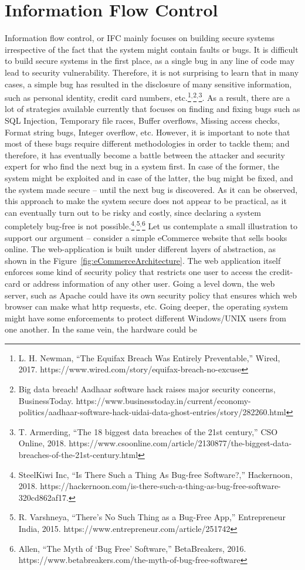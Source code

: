 \section{Information Flow Control}
\label{section:InformationFlowControl}
Information flow control, or IFC mainly focuses on building secure systems irrespective of the fact that the system might contain faults or bugs. It is difficult to build secure systems in the first place, as a single bug in any line of code may lead to security vulnerability. Therefore, it is not surprising to learn that in many cases, a simple bug has resulted in the disclosure of many sensitive information, such as personal identity, credit card numbers, etc.\footnote{L. H. Newman, “The Equifax Breach Was Entirely Preventable,” Wired, 2017. https://www.wired.com/story/equifax-breach-no-excuse}$^{,}$\footnote{Big data breach! Aadhaar software hack raises major security concerns, BusinessToday. https://www.businesstoday.in/current/economy-politics/aadhaar-software-hack-uidai-data-ghost-entries/story/282260.html}$^{,}$\footnote{T. Armerding, “The 18 biggest data breaches of the 21st century,” CSO Online, 2018. https://www.csoonline.com/article/2130877/the-biggest-data-breaches-of-the-21st-century.html}. As a result, there are a lot of strategies available currently that focuses on finding and fixing bugs such as SQL Injection, Temporary file races, Buffer overflows, Missing access checks, Format string bugs, Integer overflow, etc. However, it is important to note that most of these bugs require different methodologies in order to tackle them; and therefore, it has eventually become a battle between the attacker and security expert for who find the next bug in a system first. In case of the former, the system might be exploited and in case of the latter, the bug might be fixed, and the system made secure – until the next bug is discovered. As it can be observed, this approach to make the system secure does not appear to be practical, as it can eventually turn out to be risky and costly, since declaring a system completely bug-free is not possible.\footnote{SteelKiwi Inc, “Is There Such a Thing As Bug-free Software?,” Hackernoon, 2018. https://hackernoon.com/is-there-such-a-thing-as-bug-free-software-320cd862af17.}$^{,}$\footnote{R. Varshneya, “There’s No Such Thing as a Bug-Free App,” Entrepreneur India, 2015. https://www.entrepreneur.com/article/251742}$^{,}$\footnote{Allen, “The Myth of ‘Bug Free’ Software,” BetaBreakers, 2016. https://www.betabreakers.com/the-myth-of-bug-free-software} Let us contemplate a small illustration to support our argument – consider a simple eCommerce website that sells books online. The web-application is built under different layers of abstraction, as shown in the Figure~\ref{fig:eCommerceArchitecture}. The web application itself enforces some kind of security policy that restricts one user to access the credit-card or address information of any other user. Going a level down, the web server, such as Apache could have its own security policy that ensures which web browser can make what http requests, etc. Going deeper, the operating system might have some enforcements to protect different Windows/UNIX users from one another. In the same vein, the hardware could be 